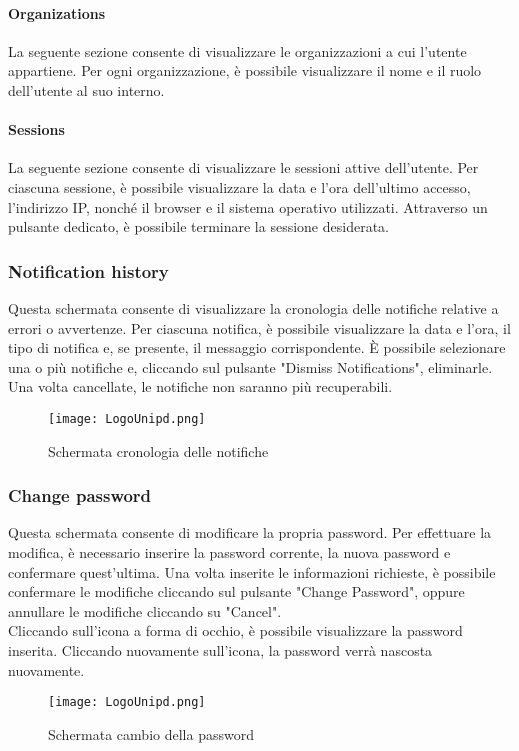 \documentclass[10pt]{article}
\begin{document}
\begin{justify}
    \paragraph{Organizations}
    La seguente sezione consente di visualizzare le organizzazioni a cui l'utente appartiene. Per ogni organizzazione, è possibile visualizzare il nome e il ruolo dell'utente al suo interno.  
    
    \paragraph{Sessions}
    La seguente sezione consente di visualizzare le sessioni attive dell'utente. Per ciascuna sessione, è possibile visualizzare la data e l'ora dell'ultimo accesso, l'indirizzo IP, nonché il browser e il sistema operativo utilizzati. Attraverso un pulsante dedicato, è possibile terminare la sessione desiderata.

    \subsubsection{Notification history}
    Questa schermata consente di visualizzare la cronologia delle notifiche relative a errori o avvertenze. Per ciascuna notifica, è possibile visualizzare la data e l'ora, il tipo di notifica e, se presente, il messaggio corrispondente. È possibile selezionare una o più notifiche e, cliccando sul pulsante "Dismiss Notifications", eliminarle. Una volta cancellate, le notifiche non saranno più recuperabili.
    \begin{figure}[H]
    \centering
    \texttt{[image: LogoUnipd.png]}
    \caption{Schermata cronologia delle notifiche}
    \end{figure}

    \subsubsection{Change password}
    Questa schermata consente di modificare la propria password. Per effettuare la modifica, è necessario inserire la password corrente, la nuova password e confermare quest'ultima. Una volta inserite le informazioni richieste, è possibile confermare le modifiche cliccando sul pulsante "Change Password", oppure annullare le modifiche cliccando su "Cancel".\\
    Cliccando sull'icona a forma di occhio, è possibile visualizzare la password inserita. Cliccando nuovamente sull'icona, la password verrà nascosta nuovamente.
    \begin{figure}[H]
    \centering
    \texttt{[image: LogoUnipd.png]}
    \caption{Schermata cambio della password}
    \end{figure}


\end{justify}
\end{document}
